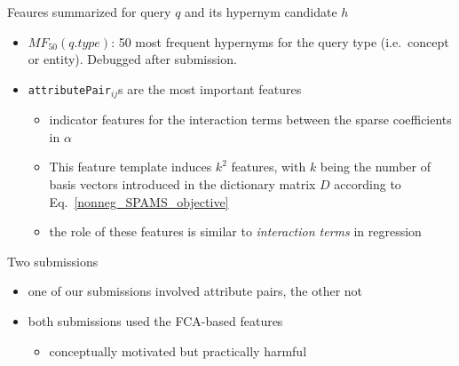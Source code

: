 \documentclass{beamer}
\newlength{\onecolwid}
\newcommand{\bull}[1]{
  \begin{itemize}
    \item #1
  \end{itemize}
}
\begin{document}
\begin{frame}[t]
\begin{columns}[t]
\begin{column}{\onecolwid}
\begin{block}{Feaures summarized}{ for query $q$ and its hypernym candidate $h$ }

\begin{itemize}
  \item $MF_{50}(q.type)$: 50 most frequent hypernyms for the query type
    (i.e.~concept or entity). Debugged after submission.


  \item \texttt{attributePair}$_{ij}$s are the most important features
    \begin{itemize}
      \item indicator features for the interaction terms between the sparse
        coefficients in $\alpha$
      \item This feature template induces $k^2$ features, with $k$ being the
        number of basis vectors introduced in the dictionary matrix $D$
        according to Eq.~\ref{nonneg_SPAMS_objective}
      \item the role of these features is similar to \emph{interaction terms}
        in regression
    \end{itemize}
\end{itemize}
\end{block}

  \begin{block}{Two submissions}
    \begin{itemize}
      \item one of our submissions involved attribute pairs, the other not
      \item both submissions used the FCA-based features
        \bull{conceptually motivated but practically harmful}
    \end{itemize}


\end{block}
\end{column}
\end{columns}
\end{frame}
\end{document}
